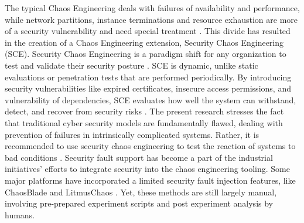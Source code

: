 \documentclass[pdflatex,sn-mathphys-num]{sn-jnl}%
\theoremstyle{thmstyleone}%
\theoremstyle{thmstyletwo}%
\theoremstyle{thmstylethree}%
\begin{document}
	The typical Chaos Engineering deals with failures of availability and performance, while network partitions, instance terminations and resource exhaustion are more of a security vulnerability and need special treatment \cite{myrbakken2021security}. This divide has resulted in the creation of a Chaos Engineering extension, Security Chaos Engineering (SCE).
	Security Chaos Engineering is a paradigm shift for any organization to test and validate their security posture \cite{shortridge2023security}. SCE is dynamic, unlike static evaluations or penetration tests that are performed periodically. By introducing security vulnerabilities like expired certificates, insecure access permissions, and vulnerability of dependencies, SCE evaluates how well the system can withstand, detect, and recover from security risks \cite{myrbakken2021security}. The present research stresses the fact that traditional cyber security models are fundamentally flawed, dealing with prevention of failures in intrinsically complicated systems. Rather, it is recommended to use security chaos engineering to test the reaction of systems to bad conditions \cite{shortridge2023security}. Security fault support has become a part of the industrial initiatives' efforts to integrate security into the chaos engineering tooling. Some major platforms have incorporated a limited security fault injection features, like ChaosBlade and LitmusChaos \cite{chaosblade2021, litmus2022}. Yet, these methods are still largely manual, involving pre-prepared experiment scripts and post experiment analysis by humans.
	
\end{document}
